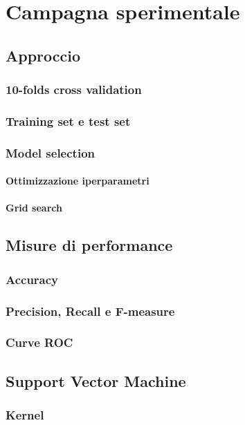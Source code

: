 \chapter{Campagna sperimentale}

\section{Approccio}
\subsection{10-folds cross validation}

\subsection{Training set e test set}

\subsection{Model selection}
\subsubsection{Ottimizzazione iperparametri}
\subsubsection{Grid search}

\section{Misure di performance}
\subsection{Accuracy}
\subsection{Precision, Recall e F-measure}
\subsection{Curve ROC}

\section{Support Vector Machine}
\subsection{Kernel}

